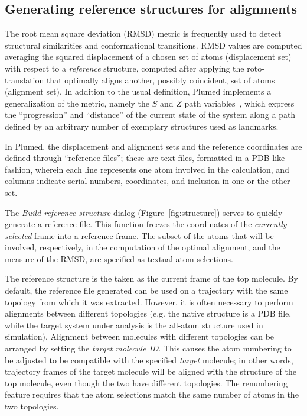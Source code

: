 \documentclass[preprint,12pt]{elsarticle}
\begin{document}
\subsection{Generating reference structures for alignments}


The root mean square deviation (RMSD) metric is frequently used to
detect structural similarities and conformational transitions.  RMSD
values are computed averaging the squared displacement of a chosen set
of atoms (displacement set) with respect to a \emph{reference}
structure, computed after applying the roto-translation that optimally
aligns another, possibly coincident, set of atoms (alignment set).  In
addition to the usual definition, Plumed implements a generalization
of the metric, namely the $S$ and $Z$ path
variables~\cite{Branduardi_Gervasio_Parrinello_2007}, which express
the ``progression'' and ``distance'' of the current state of the
system along a path defined by an arbitrary number of exemplary
structures used as landmarks.

In Plumed, the displacement and alignment sets and the reference
coordinates are defined through ``reference files''; these are text
files, formatted in a PDB-like fashion, wherein each line represents one
atom involved in the calculation, and columns indicate serial numbers,
coordinates, and inclusion in one or the other set.


The \emph{Build reference structure} dialog (Figure~\ref{fig:structure})
serves to quickly generate a reference file.  This function freezes
the coordinates of the \emph{currently selected} frame into a
reference frame. The subset of the atoms that will be involved,
respectively, in the computation of the optimal alignment, and the
measure of the RMSD, are specified as textual atom selections.

The reference structure is the taken as the current frame of the top
molecule. By default, the reference file generated can be used on a
trajectory with the same topology from which it was extracted.
However, it is often necessary to perform alignments between different
topologies (e.g. the native structure is a PDB file, while the target
system under analysis is the all-atom structure used in
simulation). Alignment between molecules with different topologies can
be arranged by setting the \emph{target molecule ID}. This causes the
atom numbering to be adjusted to be compatible with the specified
\emph{target} molecule; in other words, trajectory frames of the
target molecule will be aligned with the structure of the top
molecule, even though the two have different topologies. The
renumbering feature requires that the atom selections match the same
number of atoms in the two topologies.
\end{document}
